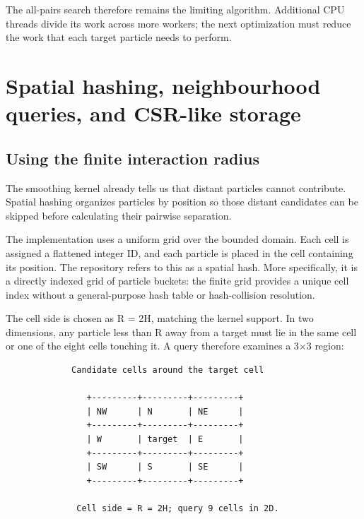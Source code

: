 \documentclass[
  11pt,
]{article}
\begin{document}
The all-pairs search therefore remains the limiting algorithm.
Additional CPU threads divide its work across more workers; the next
optimization must reduce the work that each target particle needs to
perform.

\section{Spatial hashing, neighbourhood queries, and CSR-like
storage}\label{spatial-hashing-neighbourhood-queries-and-csr-like-storage}

\subsection{Using the finite interaction
radius}\label{using-the-finite-interaction-radius}

The smoothing kernel already tells us that distant particles cannot
contribute. Spatial hashing organizes particles by position so those
distant candidates can be skipped before calculating their pairwise
separation.

The implementation uses a uniform grid over the bounded domain. Each
cell is assigned a flattened integer ID, and each particle is placed in
the cell containing its position. The repository refers to this as a
spatial hash. More specifically, it is a directly indexed grid of
particle buckets: the finite grid provides a unique cell index without a
general-purpose hash table or hash-collision resolution.

The cell side is chosen as R = 2H, matching the kernel support. In two
dimensions, any particle less than R away from a target must lie in the
same cell or one of the eight cells touching it. A query therefore
examines a 3×3 region:

\noindent\begin{minipage}{\linewidth}
\begin{verbatim}
             Candidate cells around the target cell

                +---------+---------+---------+
                | NW      | N       | NE      |
                +---------+---------+---------+
                | W       | target  | E       |
                +---------+---------+---------+
                | SW      | S       | SE      |
                +---------+---------+---------+

              Cell side = R = 2H; query 9 cells in 2D.
\end{verbatim}
\end{minipage}\par
\end{document}
